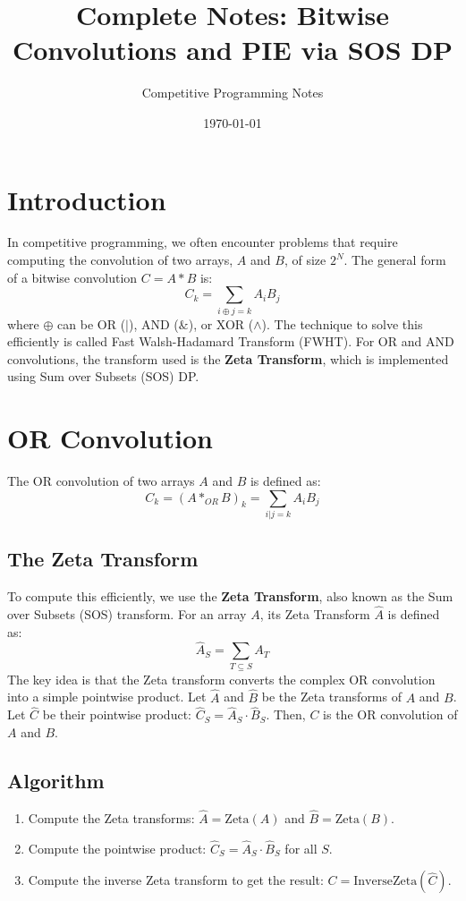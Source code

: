 \documentclass[10pt,a4paper]{article}
\title{\textbf{Complete Notes: Bitwise Convolutions and PIE via SOS DP}}
\author{Competitive Programming Notes}
\date{\today}
\begin{document}
\maketitle
\tableofcontents
\newpage

\section{Introduction}
In competitive programming, we often encounter problems that require computing the convolution of two arrays, $A$ and $B$, of size $2^N$. The general form of a bitwise convolution $C = A * B$ is:
$$ C_k = \sum_{i \oplus j = k} A_i B_j $$
where $\oplus$ can be OR ($|$), AND ($\&$), or XOR ($\wedge$). The technique to solve this efficiently is called Fast Walsh-Hadamard Transform (FWHT). For OR and AND convolutions, the transform used is the \textbf{Zeta Transform}, which is implemented using Sum over Subsets (SOS) DP.

\section{OR Convolution}
The OR convolution of two arrays $A$ and $B$ is defined as:
$$ C_k = (A *_{OR} B)_k = \sum_{i | j = k} A_i B_j $$

\subsection{The Zeta Transform}
To compute this efficiently, we use the \textbf{Zeta Transform}, also known as the Sum over Subsets (SOS) transform. For an array $A$, its Zeta Transform $\hat{A}$ is defined as:
$$ \hat{A}_S = \sum_{T \subseteq S} A_T $$
The key idea is that the Zeta transform converts the complex OR convolution into a simple pointwise product. Let $\hat{A}$ and $\hat{B}$ be the Zeta transforms of $A$ and $B$. Let $\hat{C}$ be their pointwise product: $\hat{C}_S = \hat{A}_S \cdot \hat{B}_S$. Then, $C$ is the OR convolution of $A$ and $B$.

\subsection{Algorithm}
\begin{enumerate}
    \item Compute the Zeta transforms: $\hat{A} = \text{Zeta}(A)$ and $\hat{B} = \text{Zeta}(B)$.
    \item Compute the pointwise product: $\hat{C}_S = \hat{A}_S \cdot \hat{B}_S$ for all $S$.
    \item Compute the inverse Zeta transform to get the result: $C = \text{InverseZeta}(\hat{C})$.
\end{enumerate}
\end{document}
